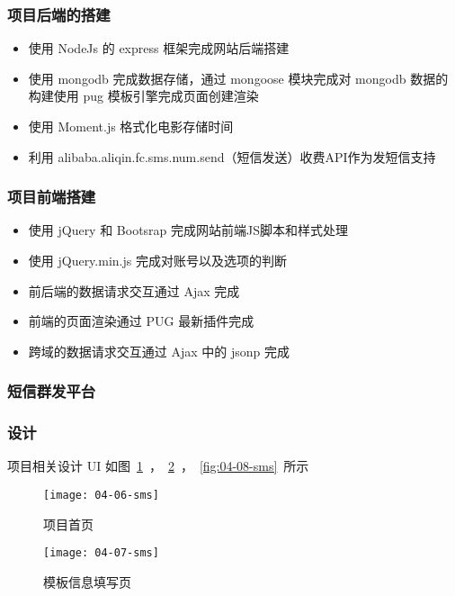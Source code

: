 \subsubsection*{项目后端的搭建}
\begin{itemize}
  \item 使用 NodeJs 的 express 框架完成网站后端搭建
  \item 使用 mongodb 完成数据存储，通过 mongoose 模块完成对 mongodb 数据的构建使用 pug 模板引擎完成页面创建渲染
  \item 使用 Moment.js 格式化电影存储时间
  \item 利用 alibaba.aliqin.fc.sms.num.send（短信发送）收费API作为发短信支持
\end{itemize}

\subsubsection*{项目前端搭建}

\begin{itemize}
  \item 使用 jQuery 和 Bootsrap 完成网站前端JS脚本和样式处理
  \item 使用 jQuery.min.js 完成对账号以及选项的判断
  \item 前后端的数据请求交互通过 Ajax 完成
  \item 前端的页面渲染通过 PUG 最新插件完成
  \item 跨域的数据请求交互通过 Ajax 中的 jsonp 完成
\end{itemize}

\subsubsection{短信群发平台}
\label{sec:requirements}

\subsubsection*{设计}

项目相关设计 UI 如图~\ref{fig:04-06-sms}~，~\ref{fig:04-07-sms}~，~\ref{fig:04-08-sms}~所示

\begin{figure}[htbp]
\centering
\texttt{[image: 04-06-sms]}
\caption{项目首页}
\label{fig:04-06-sms}
\end{figure}

\begin{figure}[htbp]
\centering
\texttt{[image: 04-07-sms]}
\caption{模板信息填写页}
\label{fig:04-07-sms}
\end{figure}


